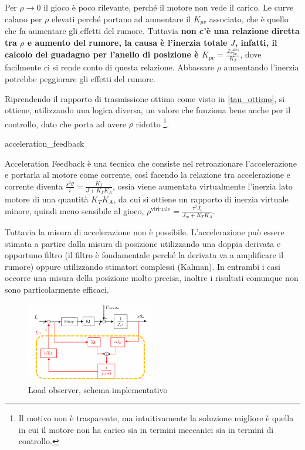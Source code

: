 Per \(\rho \rightarrow 0\) il gioco è poco rilevante, perché il motore non vede il carico. Le curve calano per \(\rho\) elevati perché portano ad aumentare il \(K_{pv}\) associato, che è quello che fa aumentare gli effetti del rumore. Tuttavia \textbf{non c'è una relazione diretta tra \(\rho\) e aumento del rumore, la causa è l'inerzia totale \(J\), infatti, il calcolo del guadagno per l'anello di posizione è \(K_{pv} = \frac{J \omega_{bv}^{des}}{K_T}\)}, dove facilmente ci si rende conto di questa relazione. Abbassare \(\rho\) aumentando l'inerzia potrebbe peggiorare gli effetti del rumore.

Riprendendo il rapporto di trasmissione ottimo come visto in \ref{tau_ottimo}, si ottiene, utilizzando una logica diversa, un valore che funziona bene anche per il controllo, dato che porta ad avere \(\rho\) ridotto \footnote{Il motivo non è trasparente, ma intuitivamente la soluzione migliore è quella in cui il motore non ha carico sia in termini meccanici sia in termini di controllo.}.


{acceleration_feedback}

Acceleration Feedback è una tecnica che consiste nel retroazionare l'accelerazione e portarla al motore come corrente, così facendo la relazione tra accelerazione e corrente diventa \(\frac{s^2\theta}{i} = \frac{K_T}{J + K_TK_A}\), ossia viene aumentata virtualmente l'inerzia lato motore di una quantità \(K_TK_A\), da cui si ottiene un rapporto di inerzia virtuale minore, quindi meno sensibile al gioco, \(\rho^\text{virtuale}=\frac{\tau^2 J_c}{J_m + K_TK_A}\).

Tuttavia la misura di accelerazione non è possibile. L'accelerazione può essere stimata a partire dalla misura di posizione utilizzando una doppia derivata e opportuno filtro (il filtro è fondamentale perché la derivata va a amplificare il rumore) oppure utilizzando stimatori complessi (Kalman). In entrambi i casi occorre una misura della posizione molto precisa, inoltre i risultati comunque non sono particolarmente efficaci.\label{misura_acc}


\begin{figure}[h]
    \centering
    \includegraphics[width=0.5\textwidth]{Immagini/load_observer.png}
    \caption{Load observer, schema implementativo}
\end{figure}

